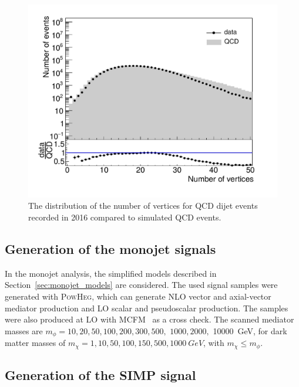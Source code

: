 \begin{itemize}
\begin{figure}[ht]
  \centering
 \includegraphics[width=.75\textwidth]{pileup.pdf} 
 \caption{The distribution of the number of vertices for \ac{QCD} dijet events recorded in 2016 compared to simulated \ac{QCD} events.}
 \label{fig:pileup}
\end{figure}
 \end{itemize}

\subsection{Generation of the monojet signals}
\label{sec:monojet_sim}

In the monojet analysis, the simplified models described in Section~\ref{sec:monojet_models} are considered. The used signal samples were generated with \textsc{PowHeg}, which can generate \ac{NLO} vector and axial-vector mediator production and \ac{LO} scalar and pseudoscalar production. The samples were also produced at \ac{LO} with MCFM~\cite{Campbell:2010ff} as a cross check. The scanned mediator masses are $m_{\phi} = 10, 20, 50, 100, 200, 300, 500,$ $ 1000, 2000,$ \SI{10000}{GeV}, for dark matter masses of $m_{\chi} = 1, 10, 50, 100, 150, 500, \SI{1000}{GeV}$, with $m_{\chi} \leq m_{\phi}$.

\subsection{Generation of the SIMP signal}
\label{sec:simp_sim}


